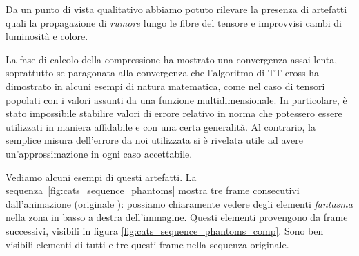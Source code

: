 \documentclass[11pt,a4paper]{article}
\begin{document}
Da un punto di vista qualitativo abbiamo potuto rilevare la presenza di artefatti quali la propagazione di \emph{rumore} lungo le fibre del tensore e improvvisi cambi di luminosità e colore.

La fase di calcolo della compressione ha mostrato una convergenza assai lenta, soprattutto se paragonata alla convergenza che l'algoritmo di TT-cross ha dimostrato in alcuni esempi di natura matematica, come nel caso di tensori popolati con i valori assunti da una funzione multidimensionale.  In particolare, è stato impossibile stabilire valori di errore relativo in norma che potessero essere utilizzati in maniera affidabile e con una certa generalità. Al contrario, la semplice misura dell'errore da noi utilizzata si è rivelata utile ad avere un'approssimazione in ogni caso accettabile.

Vediamo alcuni esempi di questi artefatti. La sequenza~\ref{fig:cats_sequence_phantoms} mostra tre frame consecutivi dall'animazione \href{http://poisson.phc.unipi.it/~bianucci/shared/tesi/cats_TT.gif}{} (originale \href{http://poisson.phc.unipi.it/~bianucci/shared/tesi/cats.gif}{}): possiamo chiaramente vedere degli elementi \emph{fantasma} nella zona in basso a destra dell'immagine. Questi elementi provengono da frame successivi, visibili in figura \ref{fig:cats_sequence_phantoms_comp}. Sono ben visibili elementi di tutti e tre questi frame nella sequenza originale.
\end{document}
